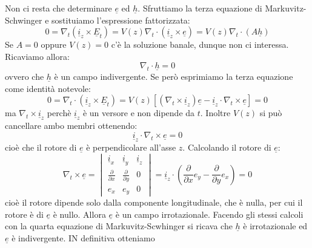 \documentclass{book}
\begin{document}
    Non ci resta che determinare $\underline{e}$ ed $\underline{h}$. Sfruttiamo la terza equazione di Markuvitz-Schwinger
    e sostituiamo l'espressione fattorizzata:
    \begin{equation}
        0 = \nabla_{t} (\underline{i}_{z} \times \underline{E}_{t})= V(z)\nabla_{t} \cdot (\underline{i}_{z} \times \underline{e}) = V(z) \nabla_{t} \cdot(A\underline{h})
    \end{equation}
    Se $A=0$ oppure $V(z)=0$ c'è la soluzione banale, dunque non ci interessa. Ricaviamo allora:
    \begin{equation}
        \nabla_{t} \cdot \underline{h} = 0
    \end{equation}
    ovvero che $\underline{h}$ è un campo indivergente. Se però esprimiamo la terza equazione come identità notevole:
    \begin{equation}
        0 = \nabla_{t} \cdot (\underline{i}_{z} \times \underline{E}_{t}) =V(z)[(\nabla_{t} \times \underline{i}_{z})\underline{e} - \underline{i}_{z} \cdot \nabla_{t} \times \underline{e}] = 0
    \end{equation}
    ma $\nabla_{t} \times \underline{i}_{z}$ perchè $\underline{i}_{z}$ è un versore e non dipende da $t$. Inoltre $V(z)$ si può cancellare ambo membri ottenendo:
    \begin{equation}
        \underline{i}_{z} \cdot \nabla_{t} \times \underline{e} = 0
    \end{equation}
    cioè che il rotore di $\underline{e}$ è perpendicolare all'asse $z$. Calcolando il rotore di $\underline{e}$:
    \begin{equation}
        \nabla_{t} \times \underline{e} = 
        \begin{vmatrix} 
            \underline{i}_{x} & \underline{i}_{y} & \underline{i}_{z} \\
            \displaystyle \frac{\partial}{\partial x} & \displaystyle \frac{\partial}{\partial y} & 0 \\
            e_{x} & e_{y} & 0
        \end{vmatrix} = \underline{i}_{z} \cdot (\frac{\partial}{\partial x}e_{y}-\frac{\partial}{\partial y}e_{x}) = 0
    \end{equation}
    cioè il rotore dipende solo dalla componente longitudinale, che è nulla, per cui il rotore è di $\underline{e}$ è nullo. 
    Allora $\underline{e}$ è un campo irrotazionale. Facendo gli stessi calcoli con la quarta equazione di Markuvitz-Scwhinger si ricava che $\underline{h}$ è irrotazionale
    ed $\underline{e}$ è indivergente. IN definitiva otteniamo
\end{document}
